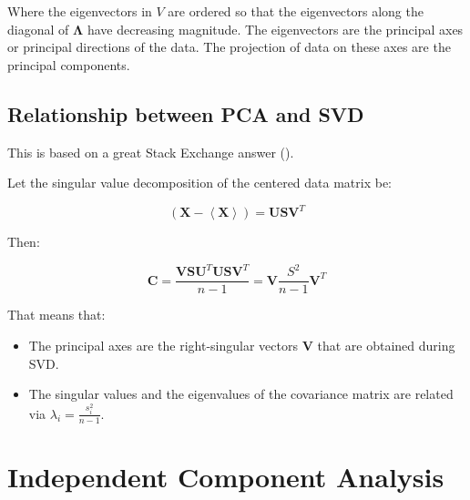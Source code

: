 Where the eigenvectors in $V$ are ordered so that the eigenvectors along the diagonal of $\mathbf{\Lambda}$ have decreasing magnitude. The eigenvectors are the principal axes or principal directions of the data. The projection of data on these axes are the principal components.

\subsection{Relationship between PCA and SVD}
This is based on a great Stack Exchange answer (\cite{amoeba2015svdpca}).

Let the singular value decomposition of the centered data matrix be:

\begin{equation}
\left(\mathbf{X}-\left<\mathbf{X}\right>\right) = \mathbf{U}\mathbf{S}\mathbf{V}^T
\end{equation}

Then:

\begin{equation}
\mathbf{C} = \frac{\mathbf{VSU}^T\mathbf{USV}^T}{n-1} = \mathbf{V}\frac{S^2}{n-1}\mathbf{V}^T
\end{equation}

That means that:

\begin{itemize}
\item The principal axes are the right-singular vectors $\mathbf{V}$ that are obtained during SVD.
\item The singular values and the eigenvalues of the covariance matrix are related via $\lambda_i = \frac{s_i^2}{n-1}$.
\end{itemize}

\section{Independent Component Analysis}
